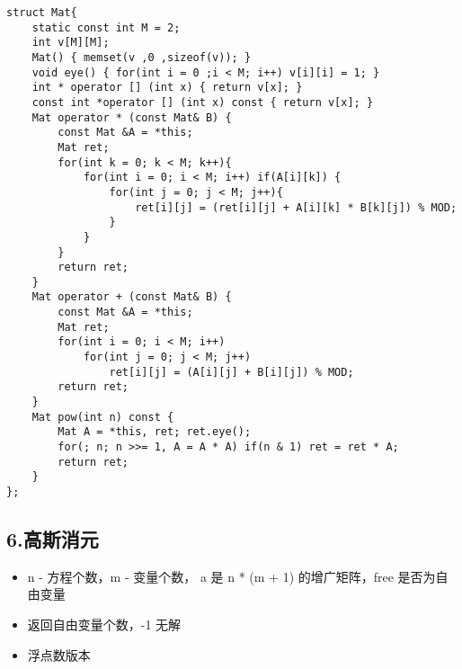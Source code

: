 \documentclass[]{article}
\begin{document}
\begin{verbatim}
struct Mat{
    static const int M = 2;
    int v[M][M];
    Mat() { memset(v ,0 ,sizeof(v)); }
    void eye() { for(int i = 0 ;i < M; i++) v[i][i] = 1; }
    int * operator [] (int x) { return v[x]; }
    const int *operator [] (int x) const { return v[x]; }
    Mat operator * (const Mat& B) {
        const Mat &A = *this;
        Mat ret;
        for(int k = 0; k < M; k++){
            for(int i = 0; i < M; i++) if(A[i][k]) {
                for(int j = 0; j < M; j++){
                    ret[i][j] = (ret[i][j] + A[i][k] * B[k][j]) % MOD;
                }
            }
        }
        return ret;
    }
    Mat operator + (const Mat& B) {
        const Mat &A = *this;
        Mat ret;
        for(int i = 0; i < M; i++)
            for(int j = 0; j < M; j++)
                ret[i][j] = (A[i][j] + B[i][j]) % MOD;
        return ret;
    }
    Mat pow(int n) const {
        Mat A = *this, ret; ret.eye();
        for(; n; n >>= 1, A = A * A) if(n & 1) ret = ret * A;
        return ret;
    }
};
\end{verbatim}

\hypertarget{ux9ad8ux65afux6d88ux5143}{%
\subsection{6.高斯消元}\label{ux9ad8ux65afux6d88ux5143}}

\begin{itemize}
\item
  n - 方程个数，m - 变量个数， a 是 n * (m + 1) 的增广矩阵，free
  是否为自由变量
\item
  返回自由变量个数，-1 无解
\item
  浮点数版本
\end{itemize}
\end{document}
